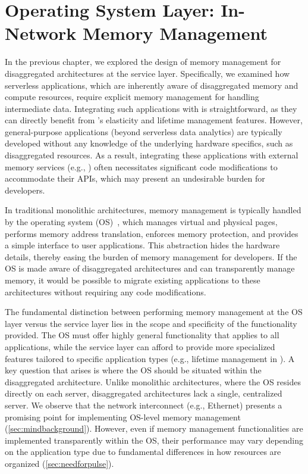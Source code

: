\chapter{Operating System Layer: In-Network Memory Management}
\label{chap:os}
In the previous chapter, we explored the design of memory management for disaggregated architectures at the service layer. Specifically, we examined how serverless applications, which are inherently aware of disaggregated memory and compute resources, require explicit memory management for handling intermediate data. Integrating such applications with \jiffy is straightforward, as they can directly benefit from \jiffy's elasticity and lifetime management features. However, general-purpose applications (beyond serverless data analytics) are typically developed without any knowledge of the underlying hardware specifics, such as disaggregated resources. As a result, integrating these applications with external memory services (e.g., \jiffy) often necessitates significant code modifications to accommodate their APIs, which may present an undesirable burden for developers.

In traditional monolithic architectures, memory management is typically handled by the operating system (OS)~\cite{memorymanagementsurvey1,memorymanagementsurvey2,memorymanagementsurvey3,memorymanagementsurvey4}, which manages virtual and physical pages, performs memory address translation, enforces memory protection, and provides a simple interface to user applications. This abstraction hides the hardware details, thereby easing the burden of memory management for developers. If the OS is made aware of disaggregated architectures and can transparently manage memory, it would be possible to migrate existing applications to these architectures without requiring any code modifications. 

The fundamental distinction between performing memory management at the OS layer versus the service layer lies in the scope and specificity of the functionality provided. The OS must offer highly general functionality that applies to all applications, while the service layer can afford to provide more specialized features tailored to specific application types (e.g., lifetime management in \jiffy). A key question that arises is where the OS should be situated within the disaggregated architecture. Unlike monolithic architectures, where the OS resides directly on each server, disaggregated architectures lack a single, centralized server. We observe that the network interconnect (e.g., Ethernet) presents a promising point for implementing OS-level memory management (\ref{sec:mindbackground}). However, even if memory management functionalities are implemented transparently within the OS, their performance may vary depending on the application type due to fundamental differences in how resources are organized (\ref{sec:needforpulse}).

